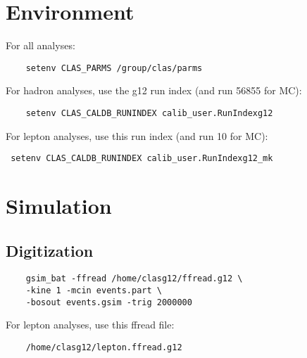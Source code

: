 \documentclass[10pt,twocolumn,oneside,letterpaper]{article}
\begin{document}
\renewcommand{\thefootnote}{\fnsymbol{footnote}}



\section{Environment}

\small

For all analyses:
\begin{verbatim}
    setenv CLAS_PARMS /group/clas/parms
\end{verbatim}
For hadron analyses, use the g12 run index (and run 56855 for MC):
\begin{verbatim}
    setenv CLAS_CALDB_RUNINDEX calib_user.RunIndexg12
\end{verbatim}
For lepton analyses, use this run index (and run 10 for MC):
\begin{verbatim}
 setenv CLAS_CALDB_RUNINDEX calib_user.RunIndexg12_mk
\end{verbatim}

\section{Simulation}

\subsection{Digitization}

\begin{verbatim}
    gsim_bat -ffread /home/clasg12/ffread.g12 \
    -kine 1 -mcin events.part \
    -bosout events.gsim -trig 2000000
\end{verbatim}
For lepton analyses, use this ffread file:
\begin{verbatim}
    /home/clasg12/lepton.ffread.g12
\end{verbatim}
\end{document}
